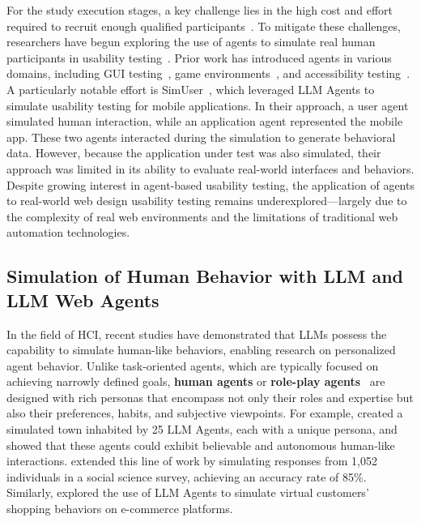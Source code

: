 \documentclass[manuscript,review,anonymous]{acmart}
\begin{document}
For the study execution stages, a key challenge lies in the high cost and effort required to recruit enough qualified participants~\cite{Nebeling2013, Jane2024}. To mitigate these challenges, researchers have begun exploring the use of agents to simulate real human participants in usability testing~\cite{ren2014agent}. 
Prior work has introduced agents in various domains, including GUI testing~\cite{eskonenAutomatingGUITesting2020}, game environments~\cite{stahlkeArtificialPlayfulnessTool2019,fernandesAgentsAutomatedUser2021}, and accessibility testing~\cite{taebAXNavReplayingAccessibility2024, zhong2025screenaudit}. 
A particularly notable effort is SimUser~\cite{xiangSimUserGeneratingUsability2024}, which leveraged LLM Agents to simulate usability testing for mobile applications. In their approach, a user agent simulated human interaction, while an application agent represented the mobile app. These two agents interacted during the simulation to generate behavioral data. However, because the application under test was also simulated, their approach was limited in its ability to evaluate real-world interfaces and behaviors.
Despite growing interest in agent-based usability testing, the application of agents to real-world web design usability testing remains underexplored—largely due to the complexity of real web environments and the limitations of traditional web automation technologies.

\subsection{Simulation of Human Behavior with LLM and LLM Web Agents}

In the field of HCI, recent studies have demonstrated that LLMs possess the capability to simulate human-like behaviors, enabling research on personalized agent behavior. Unlike task-oriented agents, which are typically focused on achieving narrowly defined goals, \textbf{human agents} or \textbf{role-play agents}~\cite{chen2025towards} are designed with rich personas that encompass not only their roles and expertise but also their preferences, habits, and subjective viewpoints. 
For example, \citet{parkGenerativeAgentsInteractive2023} created a simulated town inhabited by 25 LLM Agents, each with a unique persona, and showed that these agents could exhibit believable and autonomous human-like interactions. \citet{parkGenerativeAgentSimulations2024} extended this line of work by simulating responses from 1,052 individuals in a social science survey, achieving an accuracy rate of 85\%.
Similarly, \citet{luPromptingNotAll2025} explored the use of LLM Agents to simulate virtual customers’ shopping behaviors on e-commerce platforms. 
\end{document}
